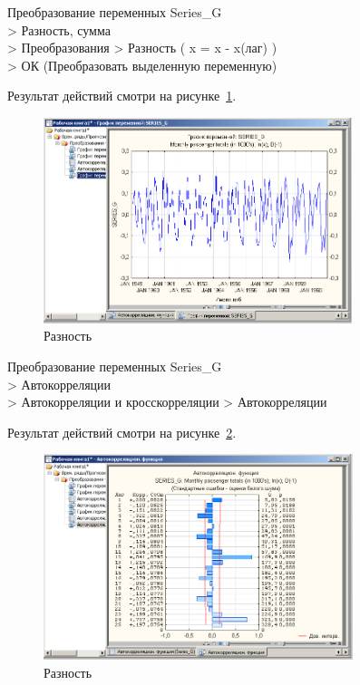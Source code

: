 Преобразование переменных Series\_G\\
> Разность, сумма\\
> Преобразования  > Разность ( x = x - x(лаг) )\\
> ОК (Преобразовать выделенную переменную)

Результат действий смотри на рисунке~\ref{fig:6}.

\begin{figure}[!h]
  \centering

  \includegraphics[height=6cm]
  {inc/6.PNG}

  \caption{Разность}

  \label{fig:6}
\end{figure}

Преобразование переменных Series\_G\\
> Автокорреляции\\
> Автокорреляции и кросскорреляции > Автокорреляции

Результат действий смотри на рисунке~\ref{fig:7}.

\begin{figure}[!h]
  \centering

  \includegraphics[height=6cm]
  {inc/7.PNG}

  \caption{Разность}

  \label{fig:7}
\end{figure}

